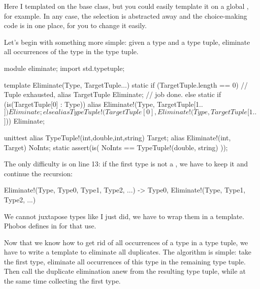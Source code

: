 Here I templated  on the base class, but you could easily template it on a global , for example. In any case, the selection is abstracted away and the choice-making code is in one place, for you to change it easily.


Let's begin with something more simple: given a type and a type tuple, eliminate all occurrences of the type in the type tuple.

\begin{ndcode}
module eliminate;
import std.typetuple;

template Eliminate(Type, TargetTuple...)
{
    static if (TargetTuple.length == 0) // Tuple exhausted,
        alias TargetTuple 
              Eliminate;    // job done.
    else static if (is(TargetTuple[0] : Type))
        alias Eliminate!(Type, TargetTuple[1..$]) 
              Eliminate;
    else
        alias TypeTuple!(TargetTuple[0], Eliminate!(Type, TargetTuple[1..$])) 
              Eliminate;
}

unittest
{
    alias TypeTuple!(int,double,int,string) Target;
    alias Eliminate!(int, Target) NoInts;
    static assert(is( NoInts == TypeTuple!(double, string) ));
}
\end{ndcode}

The only difficulty is on line 13: if the first type is not a , we have to keep it and continue the recursion:

\begin{dcode}
Eliminate!(Type,  Type0, Type1, Type2, ...)
->
Type0, Eliminate!(Type,  Type1, Type2, ...)
\end{dcode}

We cannot juxtapose types like I just did, we have to wrap them in a template. Phobos defines  in  for that use.

Now that we know how to get rid of all occurrences of a type in a type tuple, we have to write a template to eliminate all duplicates. The algorithm is simple: take the first type, eliminate all occurrences of this type in the remaining type tuple. Then call the duplicate elimination anew from the resulting type tuple, while at the same time collecting the first type.


